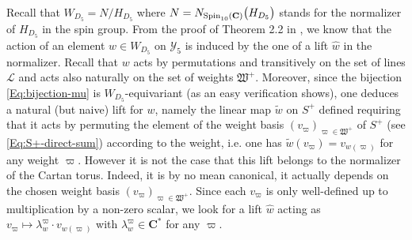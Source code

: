 \documentclass[11pt]{amsart}
\newcommand{\sk}{\smallskip}
\begin{document}
Recall that $  W_{D_5}=N/H_{D_5}$
where $N=N_{ {\rm Spin}_{10}(\mathbf C)}\big(H_{D_5}\big)$ stands for the normalizer of $H_{D_5}$ in the spin group. From the proof of Theorem 2.2 in \cite{Skorobogatov}, we know that the action of an element $w\in W_{D_5}$ on $\boldsymbol{\mathcal Y}_5$ is induced by the one of a lift $\hat w$ in the normalizer. Recall that $w$ acts by permutations and transitively on the set of lines $\mathcal L$ and acts also naturally 
on the set of weights $\mathfrak W^+$. Moreover, since the bijection 
\eqref{Eq:bijection-mu} is $W_{D_5}$-equivariant (as an easy verification shows), one deduces 
a natural (but naive) lift for $w$, namely the linear map $\tilde w$ on $S^+$ defined requiring that it acts 
by permuting the element of the weight basis $(v_\varpi)_{\varpi \in \mathfrak W^+}$  
of $S^+$ (see \eqref{Eq:S+-direct-sum}) according to the weight, i.e. one has $\tilde w(v_\varpi)=v_{w(\varpi)}$ for any weight $\varpi$. However it is not the case that this lift belongs to the normalizer of the Cartan torus. Indeed, it is by no mean canonical, it actually depends on the chosen weight basis $(v_\varpi)_{\varpi\in \mathfrak W^+}$. Since each $v_\varpi$ is only well-defined up to multiplication by a non-zero scalar,  we look for 
a lift $\hat w$ acting as $v_\varpi\mapsto \lambda_{w}^\varpi \cdot v_{w(\varpi)}$ 
with $\lambda_{w}^\varpi\in \mathbf C^*$ for any $\varpi$. 
\sk
\end{document}
